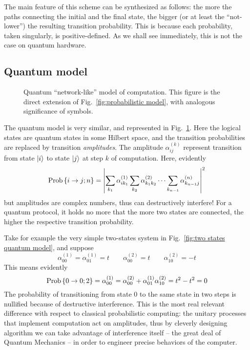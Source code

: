 The main feature of this scheme can be synthesized as follows: the more the paths connecting the initial and the final state, the bigger (or at least the ``not-lower'') the resulting transition probability. This is because each probability, taken singularly, is positive-defined. As we shall see immediately, this is not the case on quantum hardware.

\subsection{Quantum model}

\begin{figure}
    \centering
    
    \caption{Quantum ``network-like'' model of computation. This figure is the direct extension of Fig.~\ref{fig:probabilistic model}, with analogous significance of symbols.}
    \label{fig:quantum model}
\end{figure}

The quantum model is very similar, and represented in Fig.~\ref{fig:quantum model}. Here the logical states are quantum states in some Hilbert space, and the transition probabilities are replaced by transition \textit{amplitudes}. The amplitude $\alpha_{ij}^{(k)}$ represent transition from state $\ket{i}$ to state $\ket{j}$ at step $k$ of computation. Here, evidently
\[
    \mathrm{Prob}\left\lbrace i \to j; n \right\rbrace = \left| \sum_{k_1} \alpha_{ik_1}^{(1)} \sum_{k_2} \alpha_{k_1 k_2}^{(2)} \cdots \sum_{k_{n-1}} \alpha_{k_{n-1} j}^{(n)} \right|^2
\]
but amplitudes are complex numbers, thus can destructively interfere! For a quantum protocol, it holds no more that the more two states are connected, the higher the respective transition probability.

Take for example the very simple two-states system in Fig.~\ref{fig:two states quantum model}, and suppose
\[
    \alpha^{(1)}_{00} = \alpha^{(1)}_{01} = t
    \qquad
    \alpha^{(2)}_{00} = t
    \qquad
    \alpha^{(2)}_{10} = -t
\]
This means evidently
\[
    \mathrm{Prob}\left\lbrace 0 \to 0;2 \right\rbrace = \alpha^{(1)}_{00} = \alpha^{(2)}_{00} + \alpha^{(1)}_{01} \alpha^{(2)}_{10} = t^2 - t^2 = 0
\]
The probability of transitioning from state $0$ to the same state in two steps is nullified because of destructive interference. This is the most real relevant difference with respect to classical probabilistic computing: the unitary processes that implement computation act on amplitudes, thus by cleverly designing algorithm we can take advantage of interference itself -- the great deal of Quantum Mechanics -- in order to engineer precise behaviors of the computer.

